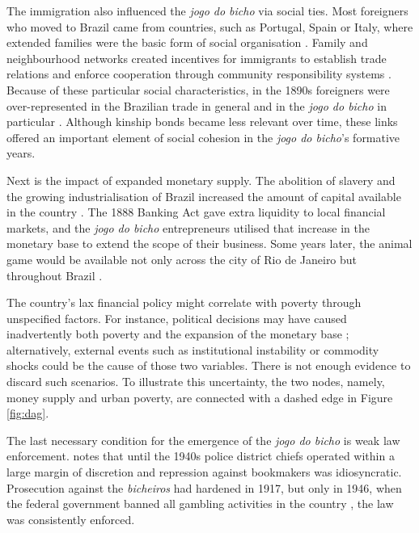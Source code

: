 \documentclass[a4paper,12pt]{article}
\begin{document}
The immigration also influenced the \emph{jogo do bicho} via social ties. Most foreigners who moved to Brazil came from countries, such as Portugal, Spain or Italy, where extended families were the basic form of social organisation \citep{klein1994imigraccao, lobo2001imigraccao, trento1989outro}. Family and neighbourhood networks created incentives for immigrants to establish trade relations and enforce cooperation through community responsibility systems \citep{roth2014prison}. Because of these particular social characteristics, in the 1890s foreigners were over-represented in the Brazilian trade in general \citep{mattos1991vadios, oliveira2001brasil, truzzi2008patricios} and in the \emph{jogo do bicho} in particular \citep{godoi2012imigraccao, magalhaes2005ganhou, torcato2011repressao, villar2008contravencao}. Although kinship bonds became less relevant over time, these links offered an important element of social cohesion in the \emph{jogo do bicho}'s formative years.

Next is the impact of expanded monetary supply. The abolition of slavery and the growing industrialisation of Brazil increased the amount of capital available in the country \citep{franco1987reformas, schulz2008financial}. The 1888 Banking Act gave extra liquidity to local financial markets, and the \emph{jogo do bicho} entrepreneurs utilised that increase in the monetary base to extend the scope of their business. Some years later, the animal game would be available not only across the city of Rio de Janeiro but throughout Brazil \citep[76]{da1999aguias}.

The country's lax financial policy might correlate with poverty through unspecified factors. For instance, political decisions may have caused inadvertently both poverty and the expansion of the monetary base \citep{mattos2013shantytown, schmidt1982modernization}; alternatively, external events such as institutional instability \citep{costantini2014index, fausto2014concise, luna2014economic} or commodity shocks \citep{musacchio2014colonial} could be the cause of those two variables. There is not enough evidence to discard such scenarios. To illustrate this uncertainty, the two nodes, namely, money supply and urban poverty, are connected with a dashed edge in Figure \ref{fig:dag}.

The last necessary condition for the emergence of the \emph{jogo do bicho} is weak law enforcement. \citet[69--100]{chazkel2011laws} notes that until the 1940s police district chiefs operated within a large margin of discretion and repression against bookmakers was idiosyncratic. Prosecution against the \emph{bicheiros} had hardened in 1917, but only in 1946, when the federal government banned all gambling activities in the country \citep[155--156]{magalhaes2005ganhou}, the law was consistently enforced.
\end{document}
